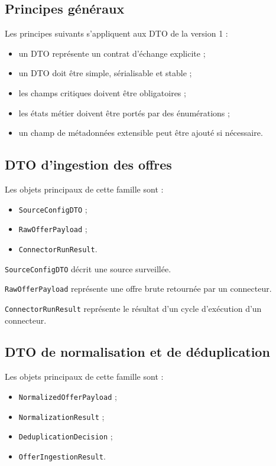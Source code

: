 \documentclass[11pt,a4paper]{article}
\begin{document}
\subsection{Principes généraux}

Les principes suivants s’appliquent aux DTO de la version 1 :

\begin{itemize}
    \item un DTO représente un contrat d’échange explicite ;
    \item un DTO doit être simple, sérialisable et stable ;
    \item les champs critiques doivent être obligatoires ;
    \item les états métier doivent être portés par des énumérations ;
    \item un champ de métadonnées extensible peut être ajouté si nécessaire.
\end{itemize}

\subsection{DTO d’ingestion des offres}

Les objets principaux de cette famille sont :

\begin{itemize}
    \item \texttt{SourceConfigDTO} ;
    \item \texttt{RawOfferPayload} ;
    \item \texttt{ConnectorRunResult}.
\end{itemize}

\texttt{SourceConfigDTO} décrit une source surveillée.

\texttt{RawOfferPayload} représente une offre brute retournée par un connecteur.

\texttt{ConnectorRunResult} représente le résultat d’un cycle d’exécution d’un connecteur.

\subsection{DTO de normalisation et de déduplication}

Les objets principaux de cette famille sont :

\begin{itemize}
    \item \texttt{NormalizedOfferPayload} ;
    \item \texttt{NormalizationResult} ;
    \item \texttt{DeduplicationDecision} ;
    \item \texttt{OfferIngestionResult}.
\end{itemize}
\end{document}
